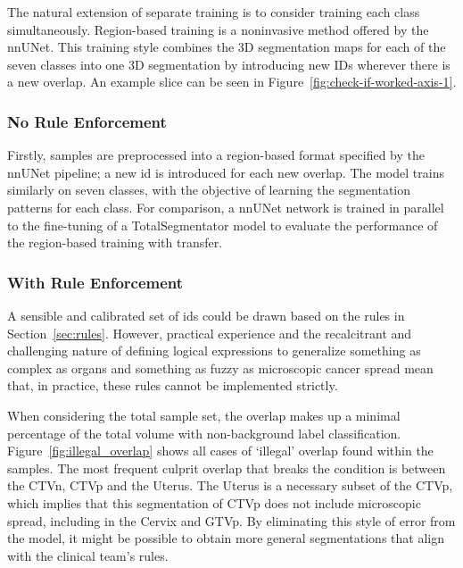 \documentclass[11pt,twoside]{report}
\begin{document}
The natural extension of separate training is to consider training each class simultaneously. Region-based training is a noninvasive method offered by the nnUNet. This training style combines the 3D segmentation maps for each of the seven classes into one 3D segmentation by introducing new IDs wherever there is a new overlap. An example slice can be seen in Figure~\ref{fig:check-if-worked-axis-1}.

\subsubsection{No Rule Enforcement}

Firstly, samples are preprocessed into a region-based format specified by the nnUNet pipeline; a new id is introduced for each new overlap. The model trains similarly on seven classes, with the objective of learning the segmentation patterns for each class. For comparison, a nnUNet network is trained in parallel to the fine-tuning of a TotalSegmentator model to evaluate the performance of the region-based training with transfer.

\subsubsection{With Rule Enforcement}

A sensible and calibrated set of ids could be drawn based on the rules in Section~\ref{sec:rules}. However, practical experience and the recalcitrant and challenging nature of defining logical expressions to generalize something as complex as organs and something as fuzzy as microscopic cancer spread mean that, in practice, these rules cannot be implemented strictly.

When considering the total sample set, the overlap makes up a minimal percentage of the total volume with non-background label classification. Figure~\ref{fig:illegal_overlap} shows all cases of `illegal' overlap found within the samples. The most frequent culprit overlap that breaks the condition is between the CTVn, CTVp and the Uterus. The Uterus is a necessary subset of the CTVp, which implies that this segmentation of CTVp does not include microscopic spread, including in the Cervix and GTVp. By eliminating this style of error from the model, it might be possible to obtain more general segmentations that align with the clinical team's rules.
\end{document}
